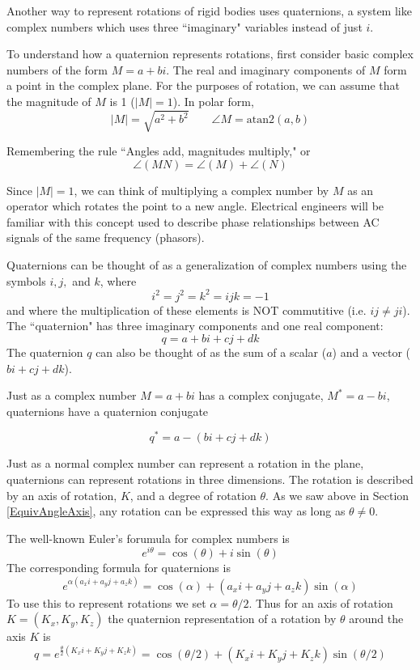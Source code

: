 Another way to represent rotations of rigid bodies uses quaternions, a system like complex numbers which uses three ``imaginary" variables instead of just $i$.

To understand how a quaternion represents rotations, first consider basic complex numbers of the form $M = a+bi$.   The real and imaginary components of $M$ form a point in the complex plane.  For the purposes of rotation, we can assume that the magnitude of $M$ is 1 ($|M|=1$).  In polar form,
\[
|M| = \sqrt{a^2+b^2}  \qquad \angle{M} = \mathrm{atan2}(a,b)
\]

Remembering the rule ``Angles add, magnitudes multiply," or
\[
\angle(MN) = \angle(M) + \angle(N)
\]

Since $|M|= 1$, we can think of multiplying a complex number by $M$ as an operator which rotates the point to a new angle.
Electrical engineers will be familiar with this concept used to describe phase relationships between AC signals of the same frequency (phasors).

Quaternions can be thought of as a generalization of complex numbers using the symbols $i, j,$ and $k$, where
\[
i^2 = j^2 = k^2 = ijk = -1
\]
and where the multiplication of these elements is NOT commutitive (i.e. $ij \neq ji$).  The ``quaternion" has three imaginary components and one real component:
\[
q = a + bi+cj+dk
\]
The quaternion $q$ can also be thought of as the sum of a scalar ($a$) and a vector ($bi+cj+dk$).

Just as a complex number $M=a+bi$ has a complex conjugate, $M^* = a - bi$, quaternions have a quaternion conjugate

\begin{equation}\label{quaternioninversedefinition}
q^* = a - (bi+cj+dk)
\end{equation}

Just as a normal complex number can represent a rotation in the plane, quaternions can represent rotations in three dimensions.  The rotation is described by an axis of rotation, $K$, and a degree of rotation $\theta$.   As we saw above in Section \ref{EquivAngleAxis}, any rotation can be expressed this way as long as $\theta \neq 0$.

The well-known Euler's forumula for complex numbers is
\[
e^{i\theta} = \cos(\theta) + i\sin(\theta)
\]
The corresponding formula for quaternions is
\[
e^{\alpha(a_xi+a_yj+a_zk)} = \cos(\alpha) + (a_xi+a_yj+a_zk)\sin(\alpha)
\]
To use this to represent rotations we set $\alpha = \theta/2$.  Thus for an axis of rotation $K = (K_x, K_y, K_z)$
the quaternion representation of a rotation by $\theta$ around the axis $K$ is
\[
q = e^{\frac{\theta}{2} (K_xi+K_yj+K_zk)} = \cos(\theta/2) + (K_xi+K_yj+K_zk)\sin(\theta/2)
\]

